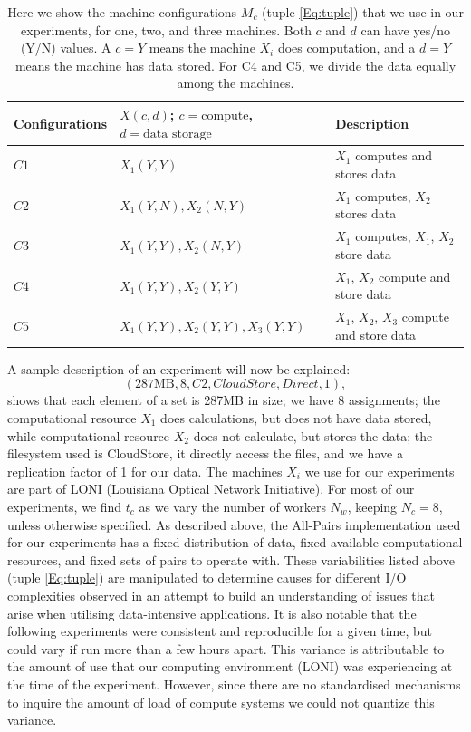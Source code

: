 \documentclass{rspublic}
\begin{document}
\begin{table}
\begin{center}
    \begin{tabular}{ | l | l | l |}
    \hline
    Configurations & $X(c,d)$; $c= \mbox{compute}$, $d=\mbox{data storage}$ & Description  \\ \hline
    $C1$ & $X_1(Y,Y)$  & $X_1$ computes and stores data\\ \hline    
    $C2$ & $X_1(Y,N), X_2(N,Y)$  & $X_1$ computes, $X_2$ stores data \\ \hline
    $C3$ & $X_1(Y,Y), X_2(N,Y)$  & $X_1$ computes, $X_1$, $X_2$ store data \\ \hline
    $C4$ & $X_1(Y,Y), X_2(Y,Y)$  & $X_1$, $X_2$ compute and store data \\ \hline
    $C5$ & $X_1(Y,Y), X_2(Y,Y), X_3(Y,Y)$  & $X_1$, $X_2$, $X_3$ compute and store data \\ 
    \hline
    \end{tabular}
\end{center}
    \caption{Here we show the machine configurations $M_c$ (tuple
\ref{Eq:tuple}) that we use in our experiments, for one, two, and three
machines. Both $c$ and $d$ can have yes/no (Y/N) values. A $c = Y$ means
the machine $X_i$ does computation, and a $d = Y$ means the machine has
data stored. For C4 and C5, we divide the data equally among the
machines.}
    \label{Tab:Configs}
\vspace{-0.5cm}
\end{table}


A sample description of an experiment will now be explained:
 \begin{equation}
(287\mbox{MB}, 8, C2, CloudStore, Direct, 1),
\end{equation}
shows that each element of a set is 287MB in size; we have 8
assignments; the computational resource $X_1$ does calculations, but
does not have data stored, while computational resource $X_2$ does not
calculate, but stores the data; the filesystem used is CloudStore, it
directly access the files, and we have a replication factor of 1 for our
data. The machines $X_i$ we use for our experiments are part of LONI
(Louisiana Optical Network Initiative). For most of our experiments, we
find $t_c$ as we vary the number of workers $N_w$, keeping $N_c=8$,
 unless otherwise specified. As described
above, the All-Pairs implementation used for our experiments has a fixed
distribution of data, fixed available computational resources, and fixed
sets of pairs to operate with. These variabilities listed above (tuple
\ref{Eq:tuple}) are manipulated to determine causes for different I/O
complexities observed in an attempt to build an understanding of issues
that arise when utilising data-intensive applications. It is also
notable that the following experiments were consistent and reproducible
for a given time, but could vary if run more than a few hours apart.
This variance is attributable to the amount of use that our computing
environment (LONI) was experiencing at the time of the experiment. However, since 
there are no standardised mechanisms to inquire the amount of load of compute systems we could not quantize this variance.
\end{document}
